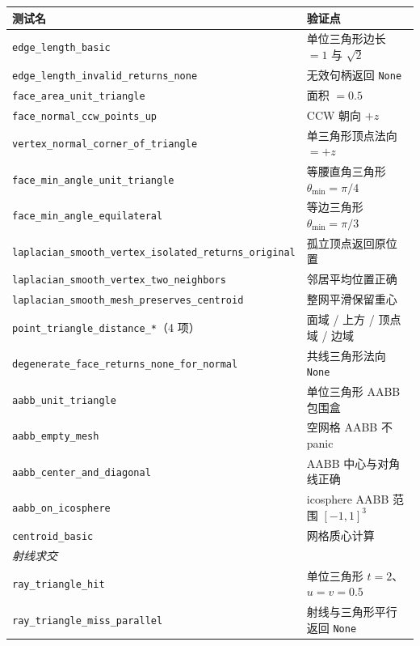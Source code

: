\documentclass[11pt,a4paper]{article}
\begin{document}
\begin{center}
\renewcommand{\arraystretch}{1.18}
\begin{tabular}{@{}ll@{}}
  \toprule
  \textbf{测试名} & \textbf{验证点} \\
  \midrule
  \texttt{edge\_length\_basic}                       & 单位三角形边长 $= 1$ 与 $\sqrt{2}$ \\
  \texttt{edge\_length\_invalid\_returns\_none}      & 无效句柄返回 \texttt{None} \\
  \texttt{face\_area\_unit\_triangle}                & 面积 $= 0.5$ \\
  \texttt{face\_normal\_ccw\_points\_up}             & CCW 朝向 $+z$ \\
  \texttt{vertex\_normal\_corner\_of\_triangle}      & 单三角形顶点法向 $= +z$ \\
  \texttt{face\_min\_angle\_unit\_triangle}          & 等腰直角三角形 $\theta_{\min} = \pi/4$ \\
  \texttt{face\_min\_angle\_equilateral}             & 等边三角形 $\theta_{\min} = \pi/3$ \\
  \texttt{laplacian\_smooth\_vertex\_isolated\_returns\_original} & 孤立顶点返回原位置 \\
  \texttt{laplacian\_smooth\_vertex\_two\_neighbors} & 邻居平均位置正确 \\
  \texttt{laplacian\_smooth\_mesh\_preserves\_centroid} & 整网平滑保留重心 \\
  \texttt{point\_triangle\_distance\_*}（4 项）      & 面域 / 上方 / 顶点域 / 边域 \\
  \texttt{degenerate\_face\_returns\_none\_for\_normal} & 共线三角形法向 \texttt{None} \\
  \texttt{aabb\_unit\_triangle}                     & 单位三角形 AABB 包围盒 \\
  \texttt{aabb\_empty\_mesh}                        & 空网格 AABB 不 panic \\
  \texttt{aabb\_center\_and\_diagonal}              & AABB 中心与对角线正确 \\
  \texttt{aabb\_on\_icosphere}                      & icosphere AABB 范围 $[-1,1]^3$ \\
  \texttt{centroid\_basic}                          & 网格质心计算 \\
  \midrule
  \multicolumn{2}{l}{\textit{射线求交}} \\
  \texttt{ray\_triangle\_hit}                       & 单位三角形 $t = 2$、$u = v = 0.5$ \\
  \texttt{ray\_triangle\_miss\_parallel}            & 射线与三角形平行返回 \texttt{None} \\

\end{tabular}
\end{center}
\end{document}
